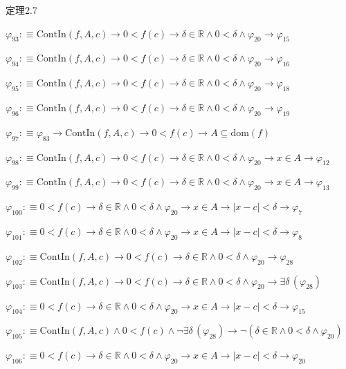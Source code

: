 \begin{fullproof}{定理2.7}
\begin{abbrevlist}
\item $\varphi_{93} :\equiv \mathrm{ContIn}(f,A,c) \to 0 < f(c) \to \delta \in \mathbb{R} \land 0 < \delta \land \varphi_{20} \to \varphi_{15}$
\item $\varphi_{94} :\equiv \mathrm{ContIn}(f,A,c) \to 0 < f(c) \to \delta \in \mathbb{R} \land 0 < \delta \land \varphi_{20} \to \varphi_{16}$
\item $\varphi_{95} :\equiv \mathrm{ContIn}(f,A,c) \to 0 < f(c) \to \delta \in \mathbb{R} \land 0 < \delta \land \varphi_{20} \to \varphi_{18}$
\item $\varphi_{96} :\equiv \mathrm{ContIn}(f,A,c) \to 0 < f(c) \to \delta \in \mathbb{R} \land 0 < \delta \land \varphi_{20} \to \varphi_{19}$
\item $\varphi_{97} :\equiv \varphi_{83} \to \mathrm{ContIn}(f,A,c) \to 0 < f(c) \to A \subseteq \mathrm{dom}(f)$
\item $\varphi_{98} :\equiv \mathrm{ContIn}(f,A,c) \to 0 < f(c) \to \delta \in \mathbb{R} \land 0 < \delta \land \varphi_{20} \to x \in A \to \varphi_{12}$
\item $\varphi_{99} :\equiv \mathrm{ContIn}(f,A,c) \to 0 < f(c) \to \delta \in \mathbb{R} \land 0 < \delta \land \varphi_{20} \to x \in A \to \varphi_{13}$
\item $\varphi_{100} :\equiv 0 < f(c) \to \delta \in \mathbb{R} \land 0 < \delta \land \varphi_{20} \to x \in A \to \lvert x - c \rvert < \delta \to \varphi_{7}$
\item $\varphi_{101} :\equiv 0 < f(c) \to \delta \in \mathbb{R} \land 0 < \delta \land \varphi_{20} \to x \in A \to \lvert x - c \rvert < \delta \to \varphi_{8}$
\item $\varphi_{102} :\equiv \mathrm{ContIn}(f,A,c) \to 0 < f(c) \to \delta \in \mathbb{R} \land 0 < \delta \land \varphi_{20} \to \varphi_{28}$
\item $\varphi_{103} :\equiv \mathrm{ContIn}(f,A,c) \to 0 < f(c) \to \delta \in \mathbb{R} \land 0 < \delta \land \varphi_{20} \to \exists \delta\,(\varphi_{28})$
\item $\varphi_{104} :\equiv 0 < f(c) \to \delta \in \mathbb{R} \land 0 < \delta \land \varphi_{20} \to x \in A \to \lvert x - c \rvert < \delta \to \varphi_{15}$
\item $\varphi_{105} :\equiv \mathrm{ContIn}(f,A,c) \land 0 < f(c) \land \neg \exists \delta\,(\varphi_{28}) \to \neg (\delta \in \mathbb{R} \land 0 < \delta \land \varphi_{20})$
\item $\varphi_{106} :\equiv 0 < f(c) \to \delta \in \mathbb{R} \land 0 < \delta \land \varphi_{20} \to x \in A \to \lvert x - c \rvert < \delta \to \varphi_{20}$

\end{abbrevlist}
\end{fullproof}
